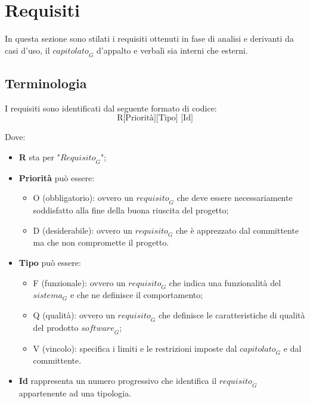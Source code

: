 \documentclass[12pt, oneside]{article}
\begin{document}
%
%

%

%

\section{Requisiti}
In questa sezione sono stilati i requisiti ottenuti in fase di analisi e derivanti da casi d'uso, il $\textit{capitolato}_G$ d'appalto e verbali sia interni che esterni. 
\subsection{Terminologia}
I requisiti sono identificati dal seguente formato di codice:
\[
\text{R[Priorità][Tipo] [Id]}
\]

Dove:
\begin{itemize}
    \item \textbf{R} sta per "$\textit{Requisito}_G$";
    \item \textbf{Priorità} può essere:
    \begin{itemize}
        \item O (obbligatorio): ovvero un $\textit{requisito}_G$ che deve essere necessariamente soddisfatto alla fine della buona riuscita del progetto;
        \item D (desiderabile): ovvero un $\textit{requisito}_G$ che è apprezzato dal committente ma che non compromette il progetto.
    \end{itemize}
    \item \textbf{Tipo} può essere:
    \begin{itemize}
        \item F (funzionale): ovvero un $\textit{requisito}_G$ che indica una funzionalità del $\textit{sistema}_G$ e che ne definisce il comportamento;
        \item Q (qualità): ovvero un $\textit{requisito}_G$ che definisce le caratteristiche di qualità del prodotto $\textit{software}_G$;
        \item V (vincolo): specifica i limiti e le restrizioni imposte dal $\textit{capitolato}_G$ e dal committente.
    \end{itemize}
    \item \textbf{Id} rappresenta un numero progressivo che identifica il $\textit{requisito}_G$ appartenente ad una tipologia.
\end{itemize}
\newpage
\end{document}
